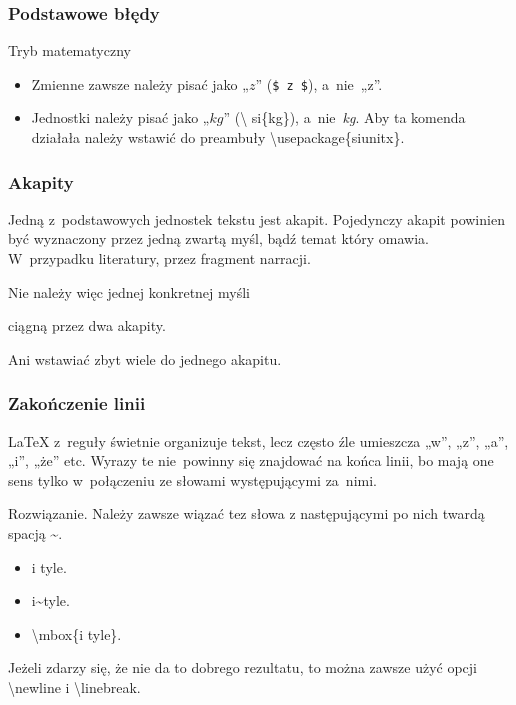 \documentclass[10pt,t]{beamer}
\begin{document}
\begin{frame}[fragile]
  \frametitle{Podstawowe błędy}


  Tryb matematyczny
  \begin{itemize}
    \RaggedRight

  \item Zmienne zawsze należy pisać jako „$z$” (\texttt{\$ z \$}),
    a~nie~„z”.

  \item Jednostki należy pisać jako „$\si{kg}$” (\textbackslash
    si\{kg\}), a~nie~\textit{kg}. Aby ta komenda działała należy
    wstawić do preambuły \textbackslash usepackage\{siunitx\}.

  \end{itemize}

\end{frame}





\begin{frame}
  \frametitle{Akapity}


  Jedną z~podstawowych jednostek tekstu jest akapit. Pojedynczy
  akapit powinien być wyznaczony przez jedną zwartą myśl, bądź temat
  który omawia. W~przypadku literatury, przez fragment narracji.

  Nie należy więc jednej konkretnej myśli

  ciągną przez dwa akapity.

  Ani wstawiać zbyt wiele do jednego akapitu.

\end{frame}





\begin{frame}
  \frametitle{Zakończenie linii}


  \LaTeX{ } z~reguły świetnie organizuje tekst, lecz często źle
  umieszcza „w”, „z”, „a”, „i”, „że” etc. Wyrazy te nie~powinny się
  znajdować na końca linii, bo mają one sens tylko w~połączeniu ze słowami
  występującymi za~nimi.

  Rozwiązanie. Należy zawsze wiązać tez słowa z następującymi po nich twardą
  spacją \textasciitilde .
  \begin{itemize}
    \RaggedRight

  \item i tyle.

  \item i\textasciitilde tyle.

  \item \textbackslash mbox\{i tyle\}.

  \end{itemize}

  Jeżeli zdarzy się, że nie da to dobrego rezultatu, to można zawsze
  użyć opcji \textbackslash newline i \textbackslash linebreak.

\end{frame}
\end{document}
